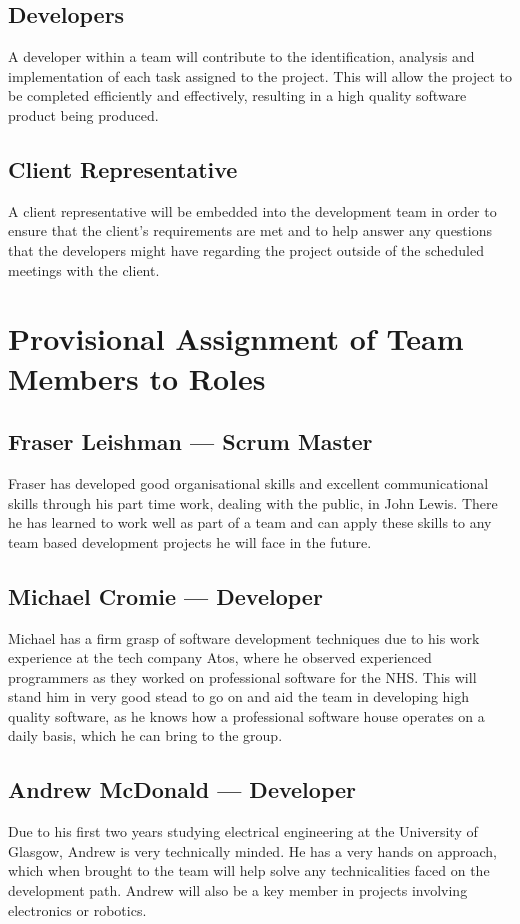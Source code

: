 \documentclass{article}
\begin{document}
\subsection{Developers}
A developer within a team will contribute to the identification, analysis and
implementation of each task assigned to the project. This will allow the
project to be completed efficiently and effectively, resulting in a high quality
software product being produced. 
\subsection{Client Representative}
A client representative will be embedded into the development team in order to 
ensure that the client's requirements are met and to help answer any questions that 
the developers might have regarding the project outside of the scheduled meetings
with the client.

\pagebreak
\section{Provisional Assignment of Team Members to Roles}
\subsection{Fraser Leishman --- Scrum Master}
Fraser has developed good organisational skills and excellent communicational skills
through his part time work, dealing with the public, in John Lewis. There he
has learned to work well as part of a team and can apply these skills to any
team based development projects he will face in the future.

\subsection{Michael Cromie --- Developer}
Michael has a firm grasp of software development techniques due to his work
experience at the tech company Atos, where he observed experienced programmers
as they worked on professional software for the NHS. This will stand him in
very good stead to go on and aid the team in developing high quality software,
as he knows how a professional software house operates on a daily basis, which he can bring to the group.

\subsection{Andrew McDonald --- Developer}
Due to his first two years studying electrical engineering at the University of
Glasgow, Andrew is very technically minded. He has a very hands on approach,
which when brought to the team will help solve any technicalities faced on the
development path. Andrew will also be a key member in projects involving
electronics or robotics.
\end{document}
